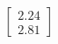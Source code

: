 \documentclass[preview]{standalone}
\begin{document}
\begin{align*}
\begin{bmatrix} 2.24 \\ 2.81 \end{bmatrix}
\end{align*}
\end{document}

